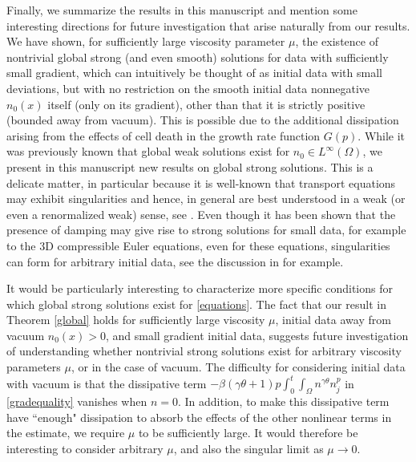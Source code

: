 \documentclass[12pt]{article}
\theoremstyle{plain}
\begin{document}
Finally, we summarize the results in this manuscript and mention some interesting directions for future investigation that arise naturally from our results. We have shown, for sufficiently large viscosity parameter $\mu$, the existence of nontrivial global strong (and even smooth) solutions for data with sufficiently small gradient, which can intuitively be thought of as initial data with small deviations, but with no restriction on the smooth initial data nonnegative $n_{0}(x)$ itself (only on its gradient), other than that it is strictly positive (bounded away from vacuum). This is possible due to the additional dissipation arising from the effects of cell death in the growth rate function $G(p)$. While it was previously known that global weak solutions exist \cite{WeberTrivisa, TrivisaWeberDrug} for $n_{0} \in L^{\infty}(\Omega)$, we present in this manuscript new results on global strong solutions. This is a delicate matter, in particular because it is well-known that transport equations may exhibit singularities and hence, in general are best understood in a weak (or even a renormalized weak) sense, see \cite{DeLellis, DiPernaLions}. Even though it has been shown that the presence of damping may give rise to strong solutions for small data, for example to the 3D compressible Euler equations, even for these equations, singularities can form for arbitrary initial data, see the discussion in \cite{Sideris} for example. 

It would be particularly interesting to characterize more specific conditions for which global strong solutions exist for \eqref{equations}. The fact that our result in Theorem \ref{global} holds for sufficiently large viscosity $\mu$, initial data away from vacuum $n_{0}(x) > 0$, and small gradient initial data, suggests future investigation of understanding whether nontrivial strong solutions exist for arbitrary viscosity parameters $\mu$, or in the case of vacuum. The difficulty for considering initial data with vacuum is that the dissipative term $\displaystyle -\beta(\gamma \theta + 1)p \int_{0}^{t} \int_{\Omega} n^{\gamma \theta} n^{p}_{j}$ in \eqref{gradequality} vanishes when $n = 0$. In addition, to make this dissipative term have ``enough" dissipation to absorb the effects of the other nonlinear terms in the estimate, we require $\mu$ to be sufficiently large. It would therefore be interesting to consider arbitrary $\mu$, and also the singular limit as $\mu \to 0$. 
\end{document}
